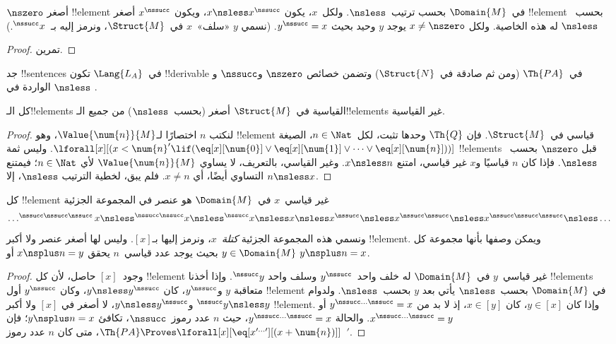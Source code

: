 \documentclass[../../../include/open-logic-section]{subfiles}
\begin{document}
\begin{prop}
 $\nszero$ أصغر !!{element} في~$\Domain{M}$
بحسب ترتيب~$\nsless$. ولكل~$x$، يكون $x \nsless x^\nssucc$، ويكون
$x^\nssucc$ أصغر !!{element} بحسب~$\nsless$ له هذه الخاصية. ولكل
$x \neq \nszero$ يوجد $y$ وحيد بحيث $y^\nssucc = x$. (نسمي $y$
«سلف»~$x$ في~$\Struct{M}$، ونرمز إليه بـ~$^\nssucc x$.)
\end{prop}

\begin{proof}
تمرين.
\end{proof}

\begin{prob}
جد !!{sentence}s في~$\Lang{L_A}$ تكون !!{derivable} في~$\Th{PA}$
(ومن ثم صادقة في~$\Struct{N}$) وتضمن خصائص $\nszero$ و$\nssucc$
و$\nsless$ الواردة في
.
\end{prob}

\begin{prop}
كل الـ!!{element}s القياسية في~$\Struct{M}$ أصغر (بحسب~$\nsless$) من
جميع الـ!!{element}s غير القياسية.
\end{prop}

\begin{proof}
لنكتب $n$ اختصارًا لـ$\Value{\num{n}}{M}$، وهو
!!{element} قياسي في~$\Struct{M}$. فإن $\Th{Q}$ وحدها
تثبت، لكل~$n \in \Nat$، الصيغة
$\lforall[x][(x < \num{n}' \lif (\eq[x][\num{0}] \lor
  \eq[x][\num{1}] \lor \dots \lor \eq[x][\num{n}]))]$.
وليس ثمة !!{element}s قبل $\nszero$ بحسب~$\nsless$.
فإذا كان $n$ قياسيًا و$x$ غير قياسي، امتنع $x \nsless n$.
وغير القياسي، بالتعريف، لا يساوي $\Value{\num{n}}{M}$
لأي $n \in \Nat$؛ فيمتنع التساوي أيضًا، أي $x \neq n$.
فلم يبق، لخطية الترتيب $\nsless$، إلا $n \nsless x$.
\end{proof}

\begin{prop}
كل !!{element} غير قياسي~$x$ في~$\Domain{M}$ هو عنصر في المجموعة الجزئية
\[
\dots ^{\nssucc\nssucc\nssucc}x \nsless ^{\nssucc\nssucc}x \nsless
^{\nssucc}x \nsless x \nsless x^{\nssucc} \nsless x^{\nssucc\nssucc}
\nsless x^{\nssucc\nssucc\nssucc} \nsless \dots
\]
ونسمي هذه المجموعة الجزئية \emph{كتلة~$x$}، ونرمز إليها بـ$[x]$.
وليس لها أصغر عنصر ولا أكبر !!{element}. ويمكن وصفها بأنها مجموعة
كل $y \in \Domain{M}$ بحيث يوجد عدد قياسي~$n$ يحقق
$x \nsplus n = y$ أو $y \nsplus n = x$.
\end{prop}

\begin{proof}
وجود~$[x]$ حاصل، لأن كل !!{element} غير قياسي~$y$
في~$\Domain{M}$ له خلف واحد~$y^\nssucc$ وسلف واحد
$^\nssucc y$. وإذا أخذنا !!{element}s متعاقبة $y$ و$y^\nssucc$،
كان $y \nsless y^\nssucc$، وكان $y^\nssucc$ أول !!{element}
في $\Domain{M}$ بحسب~$\nsless$ يأتي بعد $y$ بحسب~$\nsless$.
ولدوام $^\nssucc y \nsless y$ و$y \nsless y^\nssucc$،
لا أصغر في $[x]$ ولا أكبر !!{element}. وإذا كان
$y \in [x]$، كان $x \in [y]$، إذ لا بد من
$y^{\nssucc\dots\nssucc} = x$ أو
$x^{\nssucc\dots\nssucc} = y$. والحالة
$y^{\nssucc\dots\nssucc} = x$، حيث $n$ عدد رموز~$\nssucc$،
تكافئ $y \nsplus n = x$؛ فإن
$\Th{PA} \Proves \lforall[x][\eq[x^{\prime\dots\prime}][(x +
    \num{n})]]$، متى كان $n$ عدد رموز~$\prime$.
\end{proof}
\end{document}

